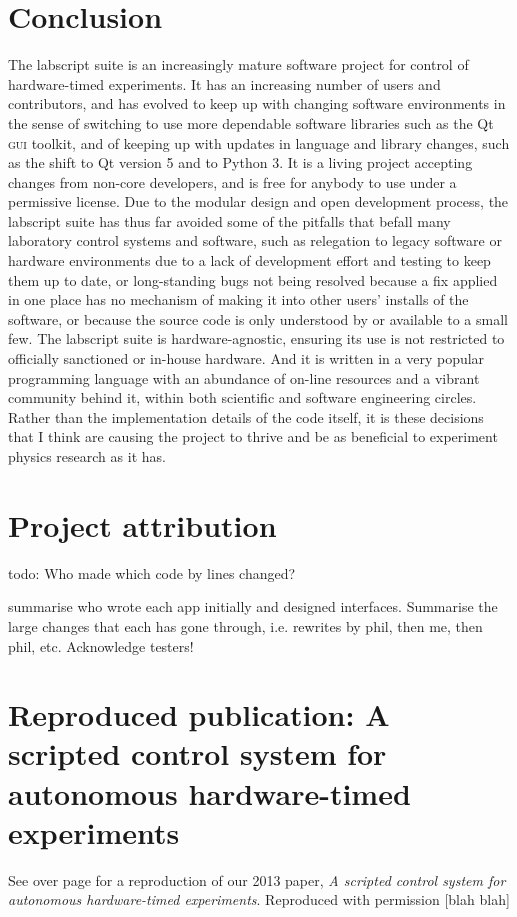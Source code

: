\section{Conclusion}

The labscript suite is an increasingly mature software project for control of hardware-timed experiments. It has an increasing number of users and contributors, and has evolved to keep up with changing software environments in the sense of switching to use more dependable software libraries such as the Qt \textsc{gui} toolkit, and of keeping up with updates in language and library changes, such as the shift to Qt version 5 and to Python 3. It is a living project accepting changes from non-core developers, and is free for anybody to use under a permissive license. Due to the modular design and open development process, the labscript suite has thus far avoided some of the pitfalls that befall many laboratory control systems and software, such as relegation to legacy software or hardware environments due to a lack of development effort and testing to keep them up to date, or long-standing bugs not being resolved because a fix applied in one place has no mechanism of making it into other users' installs of the software, or because the source code is only understood by or available to a small few. The labscript suite is hardware-agnostic, ensuring its use is not restricted to officially sanctioned or in-house hardware. And it is written in a very popular programming language with an abundance of on-line resources and a vibrant community behind it, within both scientific and software engineering circles. Rather than the implementation details of the code itself, it is these decisions that I think are causing the project to thrive and be as beneficial to experiment physics research as it has.

\section{Project attribution}

todo: Who made which code by lines changed?

summarise who wrote each app initially and designed interfaces. Summarise the large changes that each has gone through, i.e. rewrites by phil, then me, then phil, etc. Acknowledge testers!

\section{Reproduced publication: A scripted control system for autonomous hardware-timed experiments}

See over page for a reproduction of our 2013 paper, \emph{A scripted control system for autonomous hardware-timed experiments}. Reproduced with permission [blah blah]






